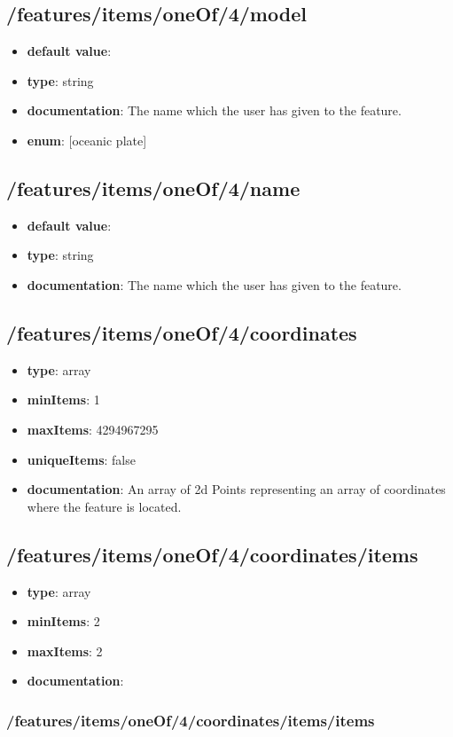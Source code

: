 \subsection{/features/items/oneOf/4/model}
\begin{itemize}\item {\bf default value}: 
\item {\bf type}: string
\item {\bf documentation}: The name which the user has given to the feature.
\item {\bf enum}: [oceanic plate]\end{itemize}\subsection{/features/items/oneOf/4/name}
\begin{itemize}\item {\bf default value}: 
\item {\bf type}: string
\item {\bf documentation}: The name which the user has given to the feature.
\end{itemize}\subsection{/features/items/oneOf/4/coordinates}
\begin{itemize}\item {\bf type}: array
\item {\bf minItems}: 1
\item {\bf maxItems}: 4294967295
\item {\bf uniqueItems}: false
\item {\bf documentation}: An array of 2d Points representing an array of coordinates where the feature is located.
\end{itemize}\subsection{/features/items/oneOf/4/coordinates/items}
\begin{itemize}\item {\bf type}: array
\item {\bf minItems}: 2
\item {\bf maxItems}: 2
\item {\bf documentation}: 
\end{itemize}\subsubsection{/features/items/oneOf/4/coordinates/items/items}
